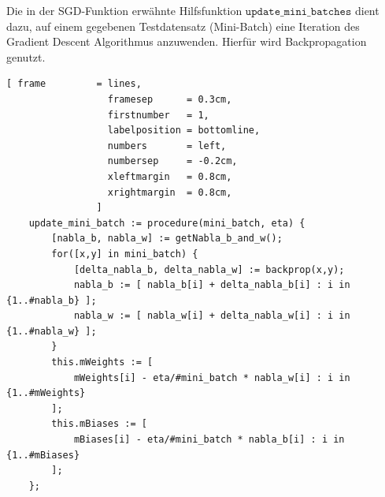 \noindent
Die in der SGD-Funktion erwähnte Hilfsfunktion $\mathtt{update\_mini\_batches}$ dient dazu, auf einem gegebenen Testdatensatz (Mini-Batch) eine Iteration des Gradient Descent Algorithmus anzuwenden. Hierfür wird Backpropagation genutzt.
\begin{Verbatim}[ frame         = lines, 
                  framesep      = 0.3cm, 
                  firstnumber   = 1,
                  labelposition = bottomline,
                  numbers       = left,
                  numbersep     = -0.2cm,
                  xleftmargin   = 0.8cm,
                  xrightmargin  = 0.8cm,
                ]
    update_mini_batch := procedure(mini_batch, eta) {
        [nabla_b, nabla_w] := getNabla_b_and_w();
        for([x,y] in mini_batch) {
            [delta_nabla_b, delta_nabla_w] := backprop(x,y);
            nabla_b := [ nabla_b[i] + delta_nabla_b[i] : i in {1..#nabla_b} ];
            nabla_w := [ nabla_w[i] + delta_nabla_w[i] : i in {1..#nabla_w} ];
        }
        this.mWeights := [ 
            mWeights[i] - eta/#mini_batch * nabla_w[i] : i in {1..#mWeights} 
        ];
        this.mBiases := [ 
            mBiases[i] - eta/#mini_batch * nabla_b[i] : i in {1..#mBiases} 
        ];
    };
\end{Verbatim}
